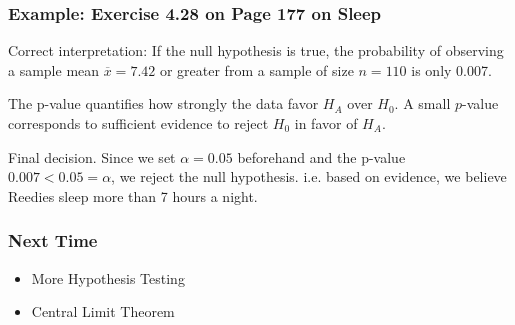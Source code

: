 \documentclass[handout]{beamer}
\newcommand{\blue}[1]{\textcolor{blue2}{#1}}
\newcommand{\xbar}{\overline{x}}
\begin{document}
\begin{frame}
\frametitle{Example:  Exercise 4.28 on Page 177 on Sleep}

\blue{Correct interpretation}:  If the null hypothesis is true, the probability of observing a sample mean $\xbar=7.42$ or greater from a sample of size $n=110$ is only 0.007.  

\pause \vspace{0.5cm}
The p-value quantifies how strongly the data favor $H_A$ over $H_0$.  A small $p$-value corresponds to sufficient evidence to reject $H_0$ in favor of $H_A$.  


\pause \vspace{0.5cm}
Final decision.  Since we set $\alpha=0.05$ \blue{beforehand} and the p-value $0.007 < 0.05 = \alpha$, we reject the null hypothesis.  i.e. based on evidence, we believe Reedies sleep more than 7 hours a night.  

\end{frame}






















\begin{frame}[fragile]
\frametitle{Next Time}

\begin{itemize}
\item More Hypothesis Testing
\item Central Limit Theorem
\end{itemize}


\end{frame}
\end{document}

